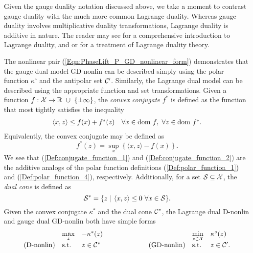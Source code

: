Given the gauge duality notation discussed above, we take a moment to contrast gauge duality with the much more common Lagrange duality.  Whereas gauge duality involves multiplicative duality transformations, Lagrange duality is additive in nature.  The reader may see \cite[Chapter 5]{boyd2004convex} for a comprehensive introduction to Lagrange duality, and \cite[Section 28]{rockafellar1970convex} or \cite[Chapter 2]{ben2001lectures} for a treatment of Lagrange duality theory.

The nonlinear pair (\ref{Eqn:PhaseLift_P_GD_nonlinear_form}) demonstrates that the gauge dual model GD-nonlin can be described simply using the polar function $\kappa^\circ$ and the antipolar set ${\mathcal C}'$.  Similarly, the Lagrange dual model can be described using the appropriate function and set transformations.  Given a function $f : {\mathcal X} \rightarrow {\mathbb R} \ \cup \ \{\pm \infty\}$, the \textit{convex conjugate} $f^*$ is defined as the function that most tightly satisfies the inequality
\begin{equation} 			\label{Def:conjugate_function_1}
\begin{array}{ll}
	\langle x, z \rangle \leq f(x) + f^*(z)
			&	\forall x \in \textnormal{dom} \ f, \ \forall z \in \textnormal{dom} \ f^*.
\end{array}
\end{equation}
Equivalently, the convex conjugate may be defined as \cite[Section 12]{rockafellar1970convex}
\begin{equation} 			\label{Def:conjugate_function_2}
f^*(z) = \sup_x \left\{ \langle x, z \rangle - f(x)  \right\}.
\end{equation}
We see that (\ref{Def:conjugate_function_1}) and (\ref{Def:conjugate_function_2}) are the additive analogs of the polar function definitions (\ref{Def:polar_function_1}) and (\ref{Def:polar_function_4}), respectively.  Additionally, for a set ${\mathcal S} \subseteq {\mathcal X}$, the \textit{dual cone} is defined as
\begin{equation}			\label{Def:dual_cone}
{\mathcal S}^* = \{ z \ | \ \langle x, z \rangle \leq 0 \ \forall x \in {\mathcal S} \}.
\end{equation}
Given the convex conjugate $\kappa^*$ and the dual cone ${\mathcal C}^*$, the Lagrange dual D-nonlin and gauge dual GD-nonlin both have simple forms
\begin{equation} 			
\begin{array}{lllllll}
	&	\max\limits_{\substack{z}}
		&	-\kappa^*(z)
			&
				&	\min\limits_{\substack{z \in {\mathcal X}}}
					&	\kappa^\circ(z)
						\\
\textnormal{(D-nonlin)}
	&	\textnormal{s.t.}
		&z \in {\mathcal C}^*
			&	\hspace{2cm} 	\textnormal{(GD-nonlin)}
				&	\textnormal{s.t.}
					&	z \in {\mathcal C}'.
\end{array}
\end{equation}
